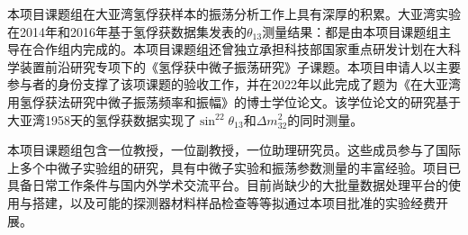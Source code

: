 \documentclass[a4paper,zihao=-4]{article}
\begin{document}



本项目课题组在大亚湾氢俘获样本的振荡分析工作上具有深厚的积累。大亚湾实验在2014年和2016年基于氢俘获数据集发表的$\theta_{13}$测量结果：都是由本项目课题组主导在合作组内完成的。本项目课题组还曾独立承担科技部国家重点研发计划在大科学装置前沿研究专项下的《氢俘获中微子振荡研究》子课题。本项目申请人以主要参与者的身份支撑了该项课题的验收工作，并在2022年以此完成了题为《在大亚湾用氢俘获法研究中微子振荡频率和振幅》的博士学位论文。该学位论文的研究基于大亚湾1958天的氢俘获数据实现了$\sin^22\theta_{13}$和$\Delta m_{32}^2$的同时测量。


本项目课题组包含一位教授，一位副教授，一位助理研究员。这些成员参与了国际上多个中微子实验组的研究，具有中微子实验和振荡参数测量的丰富经验。项目已具备日常工作条件与国内外学术交流平台。目前尚缺少的大批量数据处理平台的使用与搭建，以及可能的探测器材料样品检查等等拟通过本项目批准的实验经费开展。
\end{document}
